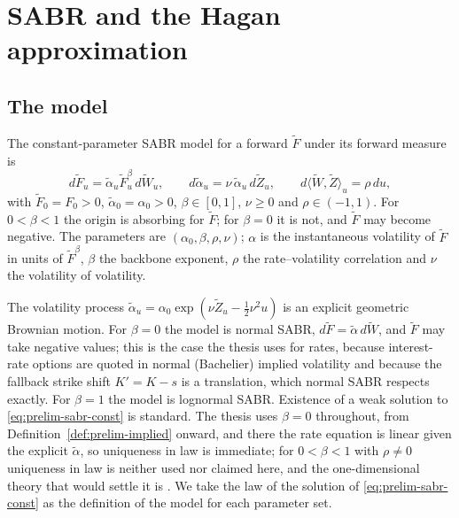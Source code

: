 \documentclass[../../../main.tex]{subfiles}
\begin{document}
\section{SABR and the Hagan approximation}\label{sec:prelim-sabr}

\subsection{The model}

\begin{definition}[SABR]\label{def:prelim-sabr}
The constant-parameter SABR model \cite[eq.~(2.15)]{hagan2002} for a forward $\tilde F$ under its forward measure is
\begin{equation}\label{eq:prelim-sabr-const}
d\tilde F_u=\tilde\alpha_u\tilde F_u^{\beta}\,d\tilde W_u,\qquad d\tilde\alpha_u=\nu\,\tilde\alpha_u\,d\tilde Z_u,\qquad d\langle\tilde W,\tilde Z\rangle_u=\rho\,du,
\end{equation}
with $\tilde F_0=F_0>0$, $\tilde\alpha_0=\alpha_0>0$, $\beta\in[0,1]$, $\nu\ge0$ and $\rho\in(-1,1)$. For $0<\beta<1$ the origin is absorbing for $\tilde F$; for $\beta=0$ it is not, and $\tilde F$ may become negative. The parameters are $(\alpha_0,\beta,\rho,\nu)$; $\alpha$ is the instantaneous volatility of $\tilde F$ in units of $\tilde F^{\beta}$, $\beta$ the backbone exponent, $\rho$ the rate--volatility correlation and $\nu$ the volatility of volatility.
\end{definition}

The volatility process $\tilde\alpha_u=\alpha_0\exp(\nu\tilde Z_u-\tfrac12\nu^2u)$ is an explicit geometric Brownian motion. For $\beta=0$ the model is normal SABR, $d\tilde F=\tilde\alpha\,d\tilde W$, and $\tilde F$ may take negative values; this is the case the thesis uses for rates, because interest-rate options are quoted in normal (Bachelier) implied volatility and because the fallback strike shift $K'=K-s$ is a translation, which normal SABR respects exactly. For $\beta=1$ the model is lognormal SABR. Existence of a weak solution to \eqref{eq:prelim-sabr-const} is standard. The thesis uses $\beta=0$ throughout, from Definition~\ref{def:prelim-implied} onward, and there the rate equation is linear given the explicit $\tilde\alpha$, so uniqueness in law is immediate; for $0<\beta<1$ with $\rho\ne0$ uniqueness in law is neither used nor claimed here, and the one-dimensional theory that would settle it is \cite[\S5.5]{karatzas1991}. We take the law of the solution of \eqref{eq:prelim-sabr-const} as the definition of the model for each parameter set.
\end{document}
